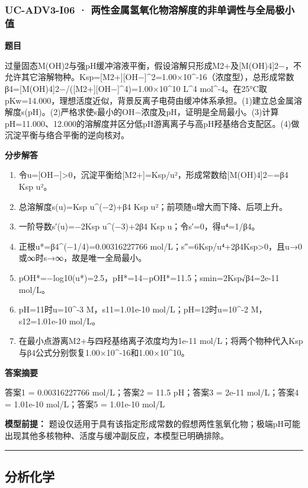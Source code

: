 \documentclass[UTF8,11pt,a4paper]{ctexart}
\begin{document}
\subsubsection*{UC-ADV3-I06 · 两性金属氢氧化物溶解度的非单调性与全局极小值}
\noindent\textbf{题目}\par
过量固态M(OH)2与强pH缓冲溶液平衡，假设溶解只形成M2+及[M(OH)4]2−，不允许其它溶解物种。Ksp=[M2+][OH−]\textasciicircum{}2=1.00×10\textasciicircum{}-16（浓度型），总形成常数β4=[M(OH)4]2−/([M2+][OH−]\textasciicircum{}4)=1.00×10\textasciicircum{}10 L\textasciicircum{}4 mol\textasciicircum{}-4。在25°C取pKw=14.000，理想活度近似，背景反离子电荷由缓冲体系承担。(1)建立总金属溶解度s(pH)。(2)严格求使s最小的OH−浓度及pH，证明是全局最小。(3)计算pH=11.000、12.000的溶解度并区分低pH游离离子与高pH羟基络合支配区。(4)做沉淀平衡与络合平衡的逆向核对。\par
\medskip\noindent\textbf{分步解答}
\begin{enumerate}
\item 令u=[OH−]>0，沉淀平衡给[M2+]=Ksp/u²，形成常数给[M(OH)4]2−=β4 Ksp u²。
\item 总溶解度s(u)=Ksp u\textasciicircum{}(−2)+β4 Ksp u²；前项随u增大而下降、后项上升。
\item 一阶导数s′(u)=−2Ksp u\textasciicircum{}(−3)+2β4 Ksp u；令s′=0，得u⁴=1/β4。
\item 正根u*=β4\textasciicircum{}(−1/4)=0.00316227766 mol/L；s″=6Ksp/u⁴+2β4Ksp>0，且u→0或∞时s→∞，故是唯一全局最小。
\item pOH*=−log10(u*)=2.5，pH*=14−pOH*=11.5；smin=2Ksp√β4=2e-11 mol/L。
\item pH=11时u=10\textasciicircum{}-3 M，s11=1.01e-10 mol/L；pH=12时u=10\textasciicircum{}-2 M，s12=1.01e-10 mol/L。
\item 在最小点游离M2+与四羟基络离子浓度均为1e-11 mol/L；将两个物种代入Ksp与β4公式分别恢复1.00×10\textasciicircum{}-16和1.00×10\textasciicircum{}10。
\end{enumerate}
\noindent\textbf{答案摘要}\par
答案1 = 0.00316227766 mol/L；答案2 = 11.5 pH；答案3 = 2e-11 mol/L；答案4 = 1.01e-10 mol/L；答案5 = 1.01e-10 mol/L\par
\noindent\textbf{模型前提：}
题设仅适用于具有该指定形成常数的假想两性氢氧化物；极端pH可能出现其他多核物种、活度与缓冲副反应，本模型已明确排除。\par
\medskip\hrule\medskip
\subsection*{分析化学}
\end{document}

